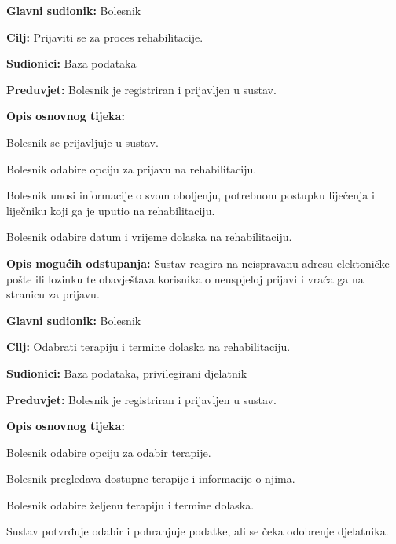 	\item \textbf{Glavni sudionik:} Bolesnik
	\item \textbf{Cilj:} Prijaviti se za proces rehabilitacije.
	\item \textbf{Sudionici:} Baza podataka
	\item \textbf{Preduvjet:} Bolesnik je registriran i prijavljen u sustav.
	\item \textbf{Opis osnovnog tijeka:}
	\begin{packed_enum}
		\item Bolesnik se prijavljuje u sustav.
		\item Bolesnik odabire opciju za prijavu na rehabilitaciju.
		\item Bolesnik unosi informacije o svom oboljenju, potrebnom postupku liječenja i liječniku koji ga je uputio na rehabilitaciju.
		\item Bolesnik odabire datum i vrijeme dolaska na rehabilitaciju.
	\end{packed_enum}
	\item \textbf{Opis mogućih odstupanja:}
	Sustav reagira na neispravanu adresu elektoničke pošte ili lozinku te obavještava korisnika o neuspjeloj prijavi i vraća ga na stranicu za prijavu.
\closeusecase

	\item \textbf{Glavni sudionik:} Bolesnik
	\item \textbf{Cilj:} Odabrati terapiju i termine dolaska na rehabilitaciju.
	\item \textbf{Sudionici:} Baza podataka, privilegirani djelatnik
	\item \textbf{Preduvjet:} Bolesnik je registriran i prijavljen u sustav.
	\item \textbf{Opis osnovnog tijeka:}
	\begin{packed_enum}
		\item Bolesnik odabire opciju za odabir terapije.
		\item Bolesnik pregledava dostupne terapije i informacije o njima.
		\item Bolesnik odabire željenu terapiju i termine dolaska.
		\item Sustav potvrđuje odabir i pohranjuje podatke, ali se čeka odobrenje djelatnika.
	\end{packed_enum}
\closeusecase

